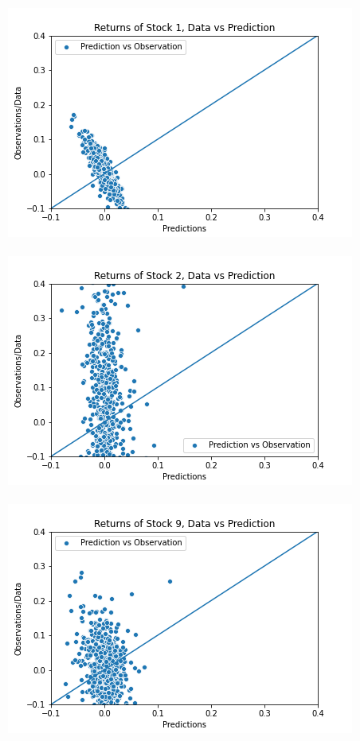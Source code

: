 \begin{figure}%
	\centering
	\begin{subfigure}[l]{0.3\textwidth}
		\includegraphics[width=\textwidth]{img/07_0/N20/Q3_kernel3_stock1_scatter.png}
	\end{subfigure}
	\begin{subfigure}[c]{0.3\textwidth}
		\includegraphics[width=\textwidth]{img/07_0/N20/Q3_kernel3_stock2_scatter.png}
	\end{subfigure}
	\begin{subfigure}[r]{0.3\textwidth}
		\includegraphics[width=\textwidth]{img/07_0/N20/Q3_kernel3_stock9_scatter.png}

\end{subfigure}
\end{figure}
